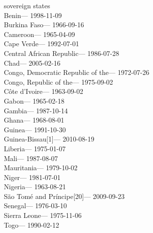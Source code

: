 sovereign states\\
\hspace*{0.333em}Benin--- 1998-11-09\\
\hspace*{0.333em}Burkina Faso--- 1966-09-16\\
\hspace*{0.333em}Cameroon--- 1965-04-09\\
\hspace*{0.333em}Cape Verde--- 1992-07-01\\
\hspace*{0.333em}Central African Republic--- 1986-07-28\\
\hspace*{0.333em}Chad--- 2005-02-16\\
\hspace*{0.333em}Congo, Democratic Republic of the--- 1972-07-26\\
\hspace*{0.333em}Congo, Republic of the--- 1975-09-02\\
\hspace*{0.333em}Côte d'Ivoire--- 1963-09-02\\
\hspace*{0.333em}Gabon--- 1965-02-18\\
\hspace*{0.333em}Gambia--- 1987-10-14\\
\hspace*{0.333em}Ghana--- 1968-08-01\\
\hspace*{0.333em}Guinea--- 1991-10-30\\
\hspace*{0.333em}Guinea-Bissau{[}1{]}--- 2010-08-19\\
\hspace*{0.333em}Liberia--- 1975-01-07\\
\hspace*{0.333em}Mali--- 1987-08-07\\
\hspace*{0.333em}Mauritania--- 1979-10-02\\
\hspace*{0.333em}Niger--- 1981-07-01\\
\hspace*{0.333em}Nigeria--- 1963-08-21\\
\hspace*{0.333em}São Tomé and Príncipe{[}20{]}--- 2009-09-23\\
\hspace*{0.333em}Senegal--- 1976-03-10\\
\hspace*{0.333em}Sierra Leone--- 1975-11-06\\
\hspace*{0.333em}Togo--- 1990-02-12

